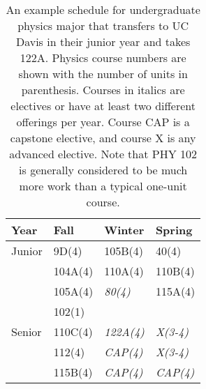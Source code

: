 \documentclass[12pt]{article}
\begin{document}
\begin{table}
\caption{An example schedule for undergraduate physics major that
  transfers to UC Davis in their junior year and takes 122A.  Physics
  course numbers are shown with the number of units in parenthesis.
  Courses in italics are electives or have at least two different
  offerings per year.  Course CAP is a capstone elective, and course X
  is any advanced elective.  Note that PHY 102 is generally considered
  to be much more work than a typical one-unit course.}
\label{tbl:current-transfers}
\begin{center}
\begin{tabular}{|l|l|l|l|}
\hline
Year      & Fall    & Winter & Spring \\
\hline
Junior    & 9D(4)   & 105B(4) & 40(4)   \\
          & 104A(4) & 110A(4) & 110B(4) \\
          & 105A(4) & {\it 80(4)}   & 115A(4) \\
          & 102(1)  &         & \\
\hline
Senior    & 110C(4) & {\it 122A(4)} & {\it X(3-4)}\\
          & 112(4)  & {\it CAP(4)}   & {\it X(3-4)}\\
          & 115B(4) & {\it CAP(4)}   & {\it CAP(4)}\\
\hline 
\end{tabular}
\end{center}
\end{table}
\end{document}
